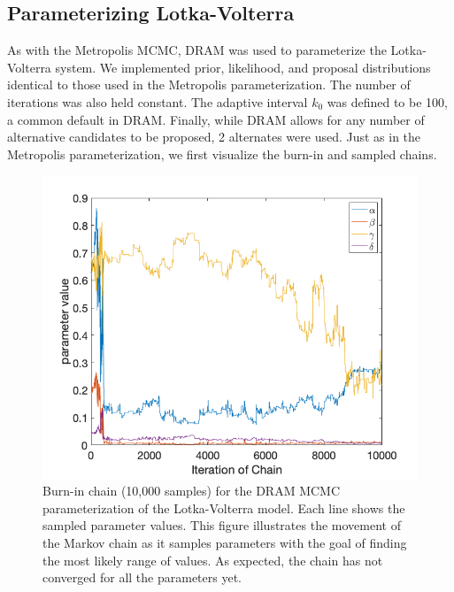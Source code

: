 \documentclass{article}
\begin{document}
\subsection{Parameterizing Lotka-Volterra}
As with the Metropolis MCMC, DRAM was used to parameterize the Lotka-Volterra system. We implemented prior, likelihood, and proposal distributions identical to those used in the Metropolis parameterization. The number of iterations was also held constant. The adaptive interval $k_0$ was defined to be 100, a common default in DRAM. Finally, while DRAM allows for any number of alternative candidates to be proposed, 2 alternates were used. Just as in the Metropolis parameterization, we first visualize the burn-in and sampled chains.
\begin{figure}[H]
    \centering
    \includegraphics[width=15cm]{MCMC_figs/met_lv_final/final_dram_burninchain.png}
    \caption{Burn-in chain (10,000 samples) for the DRAM MCMC parameterization of the Lotka-Volterra model. Each line shows the sampled parameter values. This figure illustrates the movement of the Markov chain as it samples parameters with the goal of finding the most likely range of values. As expected, the chain has not converged for all the parameters yet.}
    \label{fig:6mcmc} 
\end{figure}
\end{document}
